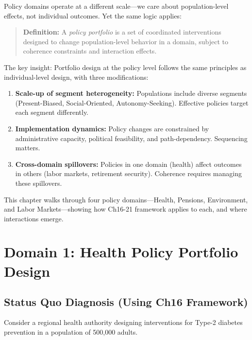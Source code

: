 Policy domains operate at a different scale---we care about population-level effects, not individual outcomes. Yet the same logic applies:

\begin{quote}
\textbf{Definition:} A \emph{policy portfolio} is a set of coordinated interventions designed to change population-level behavior in a domain, subject to coherence constraints and interaction effects.
\end{quote}

The key insight: Portfolio design at the policy level follows the same principles as individual-level design, with three modifications:

\begin{enumerate}
\item \textbf{Scale-up of segment heterogeneity:} Populations include diverse segments (Present-Biased, Social-Oriented, Autonomy-Seeking). Effective policies target each segment differently.

\item \textbf{Implementation dynamics:} Policy changes are constrained by administrative capacity, political feasibility, and path-dependency. Sequencing matters.

\item \textbf{Cross-domain spillovers:} Policies in one domain (health) affect outcomes in others (labor markets, retirement security). Coherence requires managing these spillovers.
\end{enumerate}

This chapter walks through four policy domains---Health, Pensions, Environment, and Labor Markets---showing how Ch16-21 framework applies to each, and where interactions emerge.


\section{Domain 1: Health Policy Portfolio Design}
\label{sec:health-portfolio}

\subsection{Status Quo Diagnosis (Using Ch16 Framework)}

Consider a regional health authority designing interventions for Type-2 diabetes prevention in a population of 500,000 adults.

